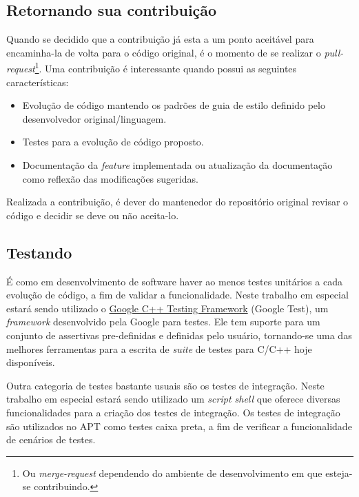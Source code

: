 \subsection*{Retornando sua contribuição} %
\label{sub:retornando_sua_contribui_o}

Quando se decidido que a contribuição já esta a um ponto aceitável para encaminha-la de volta para o código original, é o momento de se realizar o \textit{pull-request}\footnote{Ou \textit{merge-request} dependendo do ambiente de desenvolvimento em que esteja-se contribuindo.}. Uma contribuição é interessante quando possui as seguintes características:


\begin{itemize}
	\item Evolução de código mantendo os padrões de guia de estilo definido pelo desenvolvedor original/linguagem.
	\item Testes para a evolução de código proposto.
	\item Documentação da \textit{feature} implementada ou atualização da documentação como reflexão das modificações sugeridas.
\end{itemize}

Realizada a contribuição, é dever do mantenedor do repositório original revisar o código e decidir se deve ou não aceita-lo.


\subsection*{Testando} %
\label{sub:testando}

É como em desenvolvimento de software haver ao menos testes unitários a cada evolução de código, a fim de validar a funcionalidade. Neste trabalho em especial estará sendo utilizado o \href{https://github.com/google/googletest}{Google C++ Testing Framework} (Google Test), um \textit{framework} desenvolvido pela Google para testes. Ele tem suporte para um conjunto de assertivas pre-definidas e definidas pelo usuário, tornando-se uma das melhores ferramentas para a escrita de \textit{suite} de testes para C/C++ hoje disponíveis.

Outra categoria de testes bastante usuais são os testes de integração. Neste trabalho em especial estará sendo utilizado um \textit{script shell} que oferece diversas funcionalidades para a criação dos testes de integração. Os testes de integração são utilizados no APT como testes caixa preta, a fim de verificar a funcionalidade de cenários de testes.

